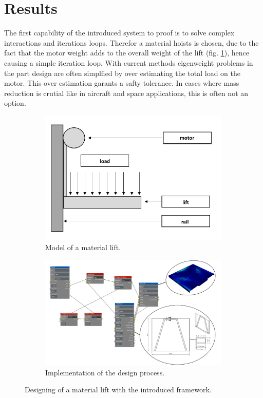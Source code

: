 \section{Results}

The first capability of the introduced system to proof is 
to solve complex interactions and iterations loops.
Therefor a material hoists is chosen, 
due to the fact that the motor weight adds 
to the overall weight of the lift (fig. \ref{pic:lift_model}), 
hence causing a simple iteration loop.
With current methods eigenweight problems in the part design are often simplfied 
by over estimating the total load on the motor.
This over estimation garants a safty tolerance.
In cases where mass reduction is crutial like in aircraft and space applications, this is often not an option.
\begin{figure}[h]
    \centering
    \begin{subfigure}[b]{0.45\textwidth}
        \centering
        \includegraphics[width=\textwidth]{pics/500Z_model.png}
        \caption{\label{pic:lift_model} Model of a material lift.}
    \end{subfigure}
    \hfill
    \begin{subfigure}[b]{0.5\textwidth}
        \centering
        \includegraphics[width=\textwidth]{pics/500Z_solution.png}
        \caption{\label{pic:lift_solu} Implementation of the design process.}
    \end{subfigure}
    \caption{\label{pic:lift} Designing of a material lift with the introduced framework.}
\end{figure}\\
